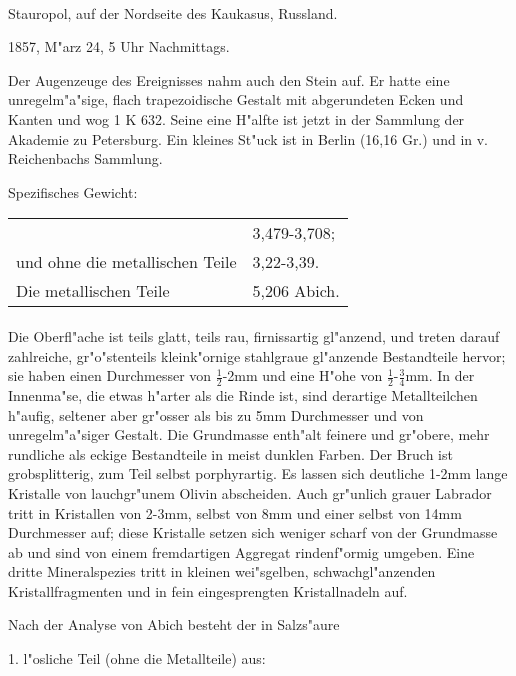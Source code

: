 \documentclass[a4paper, 11pt, oneside]{article}
\begin{document}
\paragraph{}
Stauropol, auf der Nordseite des Kaukasus, Russland.

1857, M"arz 24, 5 Uhr Nachmittags.

Der Augenzeuge des Ereignisses nahm auch den Stein auf. Er hatte eine unregelm"a"sige, flach trapezoidische Gestalt mit abgerundeten Ecken und Kanten und wog 1 K 632. Seine eine H"alfte ist jetzt in der Sammlung der Akademie zu Petersburg. Ein kleines St"uck ist in Berlin (16,16 Gr.) und in v. Reichenbachs Sammlung.

Spezifisches Gewicht:
\begin{table}[!ht]
    \centering
    \begin{tabular}{l l}
         & 3,479-3,708; \\
        und ohne die metallischen Teile & 3,22-3,39.\\
        Die metallischen Teile & 5,206 Abich.
    \end{tabular}
\end{table}
\paragraph{}
Die Oberfl"ache ist teils glatt, teils rau, firnissartig gl"anzend, und treten darauf zahlreiche, gr"o"stenteils kleink"ornige stahlgraue gl"anzende Bestandteile hervor; sie haben einen Durchmesser von $\frac{1}{2}$-2mm und eine H"ohe von $\frac{1}{2}$-$\frac{3}{4}$mm. In der Innenma"se, die etwas h"arter als die Rinde ist, sind derartige Metallteilchen h"aufig, seltener aber gr"osser als bis zu 5mm Durchmesser und von unregelm"a"siger Gestalt. Die Grundmasse enth"alt feinere und gr"obere, mehr rundliche als eckige Bestandteile in meist dunklen Farben. Der Bruch ist grobsplitterig, zum Teil selbst porphyrartig. Es lassen sich deutliche 1-2mm lange Kristalle von lauchgr"unem Olivin abscheiden. Auch gr"unlich grauer Labrador tritt in Kristallen von 2-3mm, selbst von 8mm und einer selbst von 14mm Durchmesser auf; diese Kristalle setzen sich weniger scharf von der Grundmasse ab und sind von einem fremdartigen Aggregat rindenf"ormig umgeben. Eine dritte Mineralspezies tritt in kleinen wei"sgelben, schwachgl"anzenden Kristallfragmenten und in fein eingesprengten Kristallnadeln auf.

Nach der Analyse von Abich besteht der in Salzs"aure
\begin{center}
1. l"osliche Teil (ohne die Metallteile) aus:
\end{center}
\end{document}
